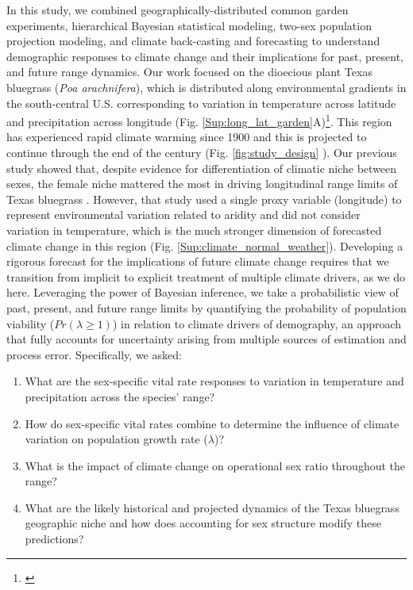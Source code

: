 \documentclass[12pt]{article}\usepackage[]{graphicx}\usepackage[dvipsnames]{xcolor}
\newcommand{\jacob}[2]{{\color{blue}{#1}}\footnote{\textit{\color{blue}{#2}}}}
\begin{document}
In this study, we combined geographically-distributed common garden experiments, hierarchical Bayesian statistical modeling, two-sex population projection modeling, and climate back-casting and forecasting to understand demographic responses to climate change and their implications for past, present, and future range dynamics. 
Our work focused on the dioecious plant Texas bluegrass (\textit{Poa arachnifera}), which is distributed along environmental gradients in the south-central U.S. corresponding to variation in temperature across latitude and precipitation across longitude (Fig. \ref{Sup:long_lat_garden}A)\jacob{}{I added this Figure because it its the best one illustrating what we are saying here}. 
This region has experienced rapid climate warming since 1900 and this is projected to continue through the end of the century (Fig. \ref{fig:study_design} ). 
Our previous study showed that, despite evidence for differentiation of climatic niche between sexes, the female niche mattered the most in driving longitudinal range limits of Texas bluegrass \citep{miller2022two}. 
However, that study used a single proxy variable (longitude) to represent environmental variation related to aridity and did not consider variation in temperature, which is the much stronger dimension of forecasted climate change in this region (Fig. \ref{Sup:climate_normal_weather}). 
Developing a rigorous forecast for the implications of future climate change requires that we transition from implicit to explicit treatment of multiple climate drivers, as we do here.
Leveraging the power of Bayesian inference, we take a probabilistic view of past, present, and future range limits by quantifying the probability of population viability ($Pr(\lambda\ge1)$) in relation to climate drivers of demography, an approach that fully accounts for uncertainty arising from multiple sources of estimation and process error. %
Specifically, we asked: 
\begin{enumerate}
	\item What are the sex-specific vital rate responses to variation in temperature and precipitation across the species' range?
	\item How do sex-specific vital rates combine to determine the influence of climate variation on population growth rate ($\lambda$)?
	\item What is the impact of climate change on operational sex ratio throughout the range?
	\item What are the likely historical and projected dynamics of the Texas bluegrass geographic niche and how does accounting for sex structure modify these predictions?
\end{enumerate}
\end{document}
